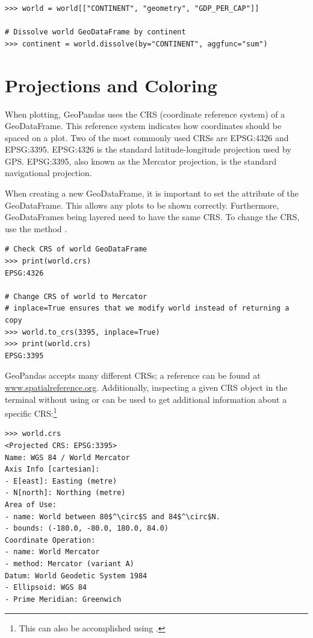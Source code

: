 \begin{lstlisting}
>>> world = world[["CONTINENT", "geometry", "GDP_PER_CAP"]]

# Dissolve world GeoDataFrame by continent
>>> continent = world.dissolve(by="CONTINENT", aggfunc="sum")
\end{lstlisting}


\section*{Projections and Coloring} %

When plotting, GeoPandas uses the CRS (coordinate reference system) of a GeoDataFrame.
This reference system indicates how coordinates should be spaced on a plot.
Two of the most commonly used CRSs are EPSG:4326 and EPSG:3395.
EPSG:4326 is the standard latitude-longitude projection used by GPS.
EPSG:3395, also known as the Mercator projection, is the standard navigational projection.

When creating a new GeoDataFrame, it is important to set the  attribute of the GeoDataFrame.
This allows any plots to be shown correctly.
Furthermore, GeoDataFrames being layered need to have the same CRS.
To change the CRS, use the method .

\begin{lstlisting}
# Check CRS of world GeoDataFrame
>>> print(world.crs)
EPSG:4326

# Change CRS of world to Mercator
# inplace=True ensures that we modify world instead of returning a copy
>>> world.to_crs(3395, inplace=True)
>>> print(world.crs)
EPSG:3395
\end{lstlisting}

GeoPandas accepts many different CRSs; a reference can be found at \url{www.spatialreference.org}.
Additionally, inspecting a given CRS object in the terminal without using  or  can be used to get additional information about a specific CRS:\footnote{This can also be accomplished using .}
\begin{lstlisting}[mathescape]
>>> world.crs
<Projected CRS: EPSG:3395>
Name: WGS 84 / World Mercator
Axis Info [cartesian]:
- E[east]: Easting (metre)
- N[north]: Northing (metre)
Area of Use:
- name: World between 80$^\circ$S and 84$^\circ$N.
- bounds: (-180.0, -80.0, 180.0, 84.0)
Coordinate Operation:
- name: World Mercator
- method: Mercator (variant A)
Datum: World Geodetic System 1984
- Ellipsoid: WGS 84
- Prime Meridian: Greenwich
\end{lstlisting}

